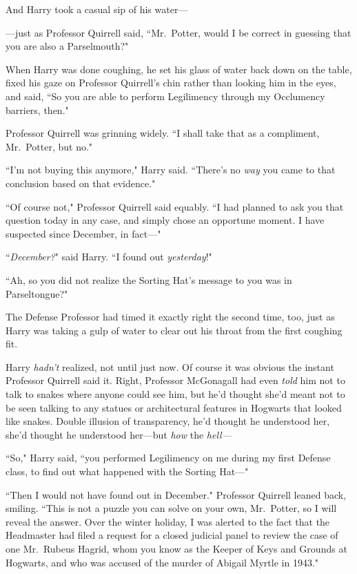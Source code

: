 And Harry took a casual sip of his water—

—just as Professor Quirrell said, ``Mr.~Potter, would I be correct in guessing that you are also a Parselmouth?"

When Harry was done coughing, he set his glass of water back down on the table, fixed his gaze on Professor Quirrell's chin rather than looking him in the eyes, and said, ``So you are able to perform Legilimency through my Occlumency barriers, then."

Professor Quirrell was grinning widely. ``I shall take that as a compliment, Mr.~Potter, but no."

``I'm not buying this anymore," Harry said. ``There's no \emph{way} you came to that conclusion based on that evidence."

``Of course not," Professor Quirrell said equably. ``I had planned to ask you that question today in any case, and simply chose an opportune moment. I have suspected since December, in fact—"

``\emph{December?}" said Harry. ``I found out \emph{yesterday}!"

``Ah, so you did not realize the Sorting Hat's message to you was in Parseltongue?"

The Defense Professor had timed it exactly right the second time, too, just as Harry was taking a gulp of water to clear out his throat from the first coughing fit.

Harry \emph{hadn't} realized, not until just now. Of course it was obvious the instant Professor Quirrell said it. Right, Professor McGonagall had even \emph{told} him not to talk to snakes where anyone could see him, but he'd thought she'd meant not to be seen talking to any statues or architectural features in Hogwarts that looked like snakes. Double illusion of transparency, he'd thought he understood her, she'd thought he understood her—but \emph{how} the \emph{hell—}

``So," Harry said, ``you performed Legilimency on me during my first Defense class, to find out what happened with the Sorting Hat—"

``Then I would not have found out in December." Professor Quirrell leaned back, smiling. ``This is not a puzzle you can solve on your own, Mr.~Potter, so I will reveal the answer. Over the winter holiday, I was alerted to the fact that the Headmaster had filed a request for a closed judicial panel to review the case of one Mr.~Rubeus Hagrid, whom you know as the Keeper of Keys and Grounds at Hogwarts, and who was accused of the murder of Abigail Myrtle in 1943."


